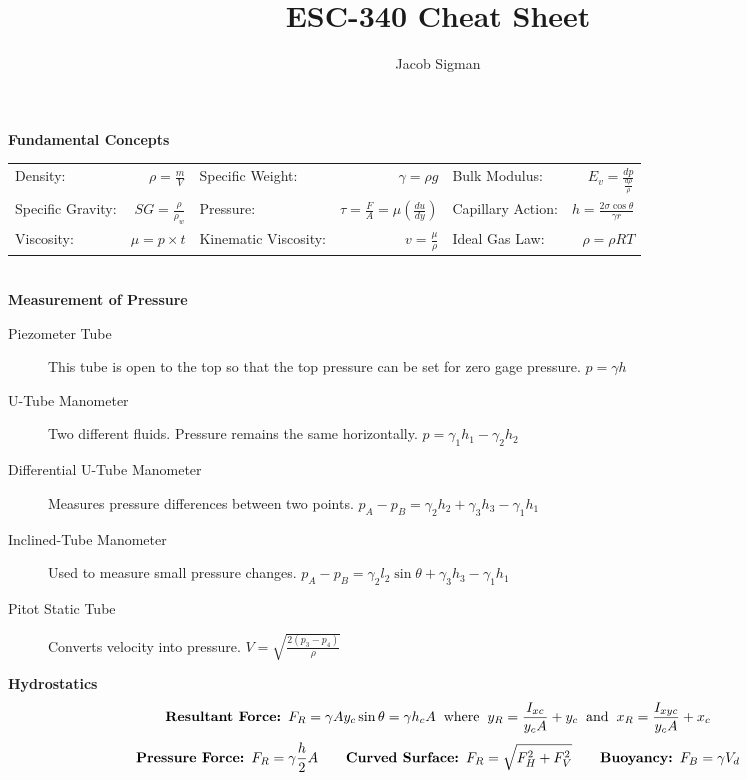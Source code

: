 \documentclass{article}
\title{ESC-340 Cheat Sheet}
\author{Jacob Sigman}
\date{}
\begin{document}
\begin{center}
    {\large{\bf Fundamental Concepts\\}}
    \vspace{3 mm}
    \begin{tabular}{|l r|l r|l r|}
        \hline
        Density: & \(\rho=\frac{m}{V}\) & Specific Weight: & \(\gamma=\rho g\) & Bulk Modulus: & \(E_v=\frac{dp}{\frac{d\rho}{\rho}}\)\\ 
        Specific Gravity: & \(SG=\frac{\rho}{\rho_w}\) & Pressure: & \(\tau=\frac{F}{A}=\mu\left(\frac{du}{dy}\right)\) & Capillary Action: & \(h=\frac{2\sigma\cos\theta}{\gamma r}\) \\ 
        Viscosity: & \(\mu=p\times t\) & Kinematic Viscosity: & \(v=\frac{\mu}{\rho}\) & Ideal Gas Law:  & \(\rho=\rho RT\) \\
        \hline
    \end{tabular}
    \vspace{5 mm}
    {\large{\bf \\Measurement of Pressure}}
    \begin{description}
        \item[Piezometer Tube] This tube is open to the top so that the top pressure can be set for zero gage pressure. \(p=\gamma h\)
        \item[U-Tube Manometer] Two different fluids. Pressure remains the same horizontally. \(p=\gamma_1h_1-\gamma_2h_2\)
        \item[Differential U-Tube Manometer] Measures pressure differences between two points. \(p_A-p_B=\gamma_2h_2+\gamma_3h_3-\gamma_1h_1\)
        \item[Inclined-Tube Manometer] Used to measure small pressure changes. \(p_A-p_B=\gamma_2l_2\sin\theta+\gamma_3h_3-\gamma_1h_1\)
        \item[Pitot Static Tube] Converts velocity into pressure. \(V=\sqrt{\frac{2(p_3-p_4)}{\rho}}\)
    \end{description}
    {\large{\bf Hydrostatics\\}}
    \vspace{3 mm}
    \[\textbf{Resultant Force: }F_R=\gamma Ay_c\sin\theta=\gamma h_cA\hspace{2 mm}\textnormal{where}\hspace{2 mm}y_R=\frac{I_{xc}}{y_cA}+y_c\hspace{2 mm}\textnormal{and}\hspace{2 mm}x_R=\frac{I_{xyc}}{y_cA}+x_c\]
    \[\textbf{Pressure Force: }F_R=\gamma\frac{h}{2}A\hspace{7 mm}\textbf{Curved Surface: }F_R=\sqrt{F_H^2+F_V^2}\hspace{7 mm}\textbf{Buoyancy: }F_B=\gamma V_d\]

\end{center}
\end{document}
